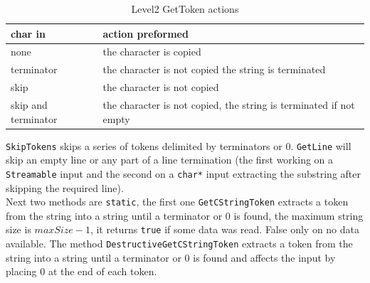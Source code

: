 \begin{table}[!h]
 \begin{center}
  \begin{tabular}{|l|l|}
   \hline
    \textbf{char in} & \textbf{action preformed} \\
   \hline
    none & the character is copied \\
    terminator & the character is not copied the string is terminated \\
    skip & the character is not copied \\
    skip and terminator & the character is not copied, the string is terminated if not empty \\
   \hline
   \end{tabular}
   \end{center}
  \caption{Level2 GetToken actions}
 \label{t:level2:gettoken}
\end{table}

\texttt{SkipTokens} skips a series of tokens delimited by terminators or 0.
\texttt{GetLine} will skip an empty line or any part of a line termination (the first working on a \texttt{Streamable} input and the second on a \texttt{char*} input extracting the substring after skipping the required line). \\


Next two methods are \texttt{static}, the first one \texttt{GetCStringToken} extracts a token from the string into a string until a terminator or 0 is found, the maximum string size is $maxSize-1$, it returns \texttt{true} if some data was read. False only on no data available. The method \texttt{DestructiveGetCStringToken} extracts a token from the string into a string until a terminator or 0 is found and affects the input by placing 0 at the end of each token.\\


